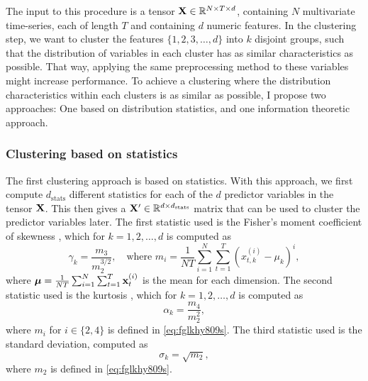 \documentclass{statsmsc}
\begin{document}
The input to this procedure is a tensor $\mathbf{X} \in \mathbb{R}^{N \times T \times d}$, containing $N$
multivariate time-series, each of length $T$ and containing $d$ numeric features.
In the clustering step, we want to cluster the features $\{1,2,3,\dots,d\}$ into $k$ disjoint groups,
such that the distribution of variables in each cluster has as similar characteristics as possible.
That way, applying the same preprocessing method to these variables might increase performance.
To achieve a clustering where the distribution characteristics within each clusters is as similar
as possible, I propose two approaches: One based on distribution statistics, and one information
theoretic approach.

\subsubsection{Clustering based on statistics}%
\label{sub:Clustering based on statistics}

The first clustering approach is based on statistics. With this approach, we first compute
$d_{\textrm{stats}}$ different statistics for each of the $d$ predictor variables in the tensor
$\mathbf{X}$. This then gives a $\mathbf{X}' \in \mathbb{R}^{d \times d_{\textrm{stats}}}$ matrix that can be used
to cluster the predictor variables later. The first statistic used is the Fisher's moment
coefficient of skewness \citep{shape}, which for $k=1,2,\dots,d$ is computed as
\begin{equation}\label{eq:fglkhy809s}
    \gamma_k=\frac{m_3}{m_2^{3/2}}, \quad \textrm{where }
    m_i=  \frac{1}{NT} \sum^{N}_{i=1} \sum^{T}_{t=1} \left(x^{(i)}_{t,k}-\mu_k \right)^i,
\end{equation}
where $\bm{\mu}=\frac{1}{NT}\sum^{N}_{i=1} \sum^{T}_{t=1} \mathbf{x}^{(i)}_t$ is the mean for each dimension. The second statistic used is the kurtosis \citep{shape}, which for $k=1,2,\dots,d$ is computed as
\begin{equation}
    \alpha_k=\frac{m_4}{m_2^2},
\end{equation}
where $m_i$ for $i\in \{2,4\}$ is defined in  \cref{eq:fglkhy809s}.
The third statistic used is the standard deviation, computed as
\begin{equation}
    \sigma_k=\sqrt{m_2},
\end{equation}
where $m_2$ is defined in \cref{eq:fglkhy809s}.
\end{document}

